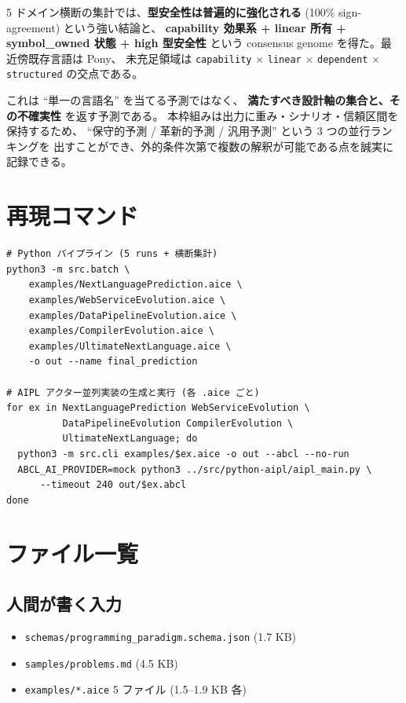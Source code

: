 \documentclass[a4paper,11pt]{article}
\begin{document}
5 ドメイン横断の集計では、{\bfseries 型安全性は普遍的に強化される}
(100\% sign-agreement) という強い結論と、
{\bfseries capability 効果系 + linear 所有 + symbol\_owned 状態 +
high 型安全性} という consensus genome を得た。最近傍既存言語は Pony、
未充足領域は \texttt{capability} \(\times\) \texttt{linear} \(\times\)
\texttt{dependent} \(\times\) \texttt{structured} の交点である。

これは ``単一の言語名'' を当てる予測ではなく、
{\bfseries 満たすべき設計軸の集合と、その不確実性} を返す予測である。
本枠組みは出力に重み・シナリオ・信頼区間を保持するため、
``保守的予測 / 革新的予測 / 汎用予測'' という 3 つの並行ランキングを
出すことができ、外的条件次第で複数の解釈が可能である点を誠実に
記録できる。

\appendix
\section{再現コマンド}

\begin{lstlisting}[caption={5 実験の一括実行と最終集計}]
# Python パイプライン (5 runs + 横断集計)
python3 -m src.batch \
    examples/NextLanguagePrediction.aice \
    examples/WebServiceEvolution.aice \
    examples/DataPipelineEvolution.aice \
    examples/CompilerEvolution.aice \
    examples/UltimateNextLanguage.aice \
    -o out --name final_prediction

# AIPL アクター並列実装の生成と実行 (各 .aice ごと)
for ex in NextLanguagePrediction WebServiceEvolution \
          DataPipelineEvolution CompilerEvolution \
          UltimateNextLanguage; do
  python3 -m src.cli examples/$ex.aice -o out --abcl --no-run
  ABCL_AI_PROVIDER=mock python3 ../src/python-aipl/aipl_main.py \
      --timeout 240 out/$ex.abcl
done
\end{lstlisting}

\section{ファイル一覧}

\subsection*{人間が書く入力}
\begin{itemize}
  \item \texttt{schemas/programming\_paradigm.schema.json} (1.7 KB)
  \item \texttt{samples/problems.md} (4.5 KB)
  \item \texttt{examples/*.aice} 5 ファイル (1.5--1.9 KB 各)
\end{itemize}
\end{document}
